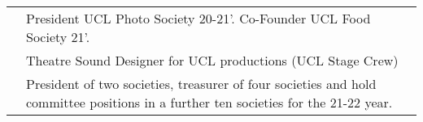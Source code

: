 \documentclass[letterpaper, 11pt]{article}
\begin{document}
\begin{longtable}{p{1.3in}p{4.8in}}



    \nohyphens{\color{OliveGreen}{Other interests}}
     & President UCL Photo Society 20-21'. Co-Founder UCL Food Society 21'.                                                                                                                                               \\
     & Theatre Sound Designer for UCL productions (UCL Stage Crew)                                                                                                                                                        \\
     & President of two societies, treasurer of four societies and hold committee positions in a further ten societies for the 21-22 year.                                                                                \\


\end{longtable}
\end{document}
